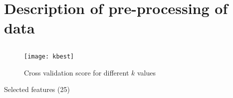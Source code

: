 
\section{Description of pre-processing of data}%
\label{sec:desc-prep}


\subsection{}

\begin{figure}[H]
    \centering
    \texttt{[image: kbest]}
    \caption{Cross validation score for different $k$ values}%
    \label{fig:feature_cross}
\end{figure}

\begin{table}[H]
    \centering
    \caption{Selected features (25)}%
    \label{tab:features}
    
\end{table}